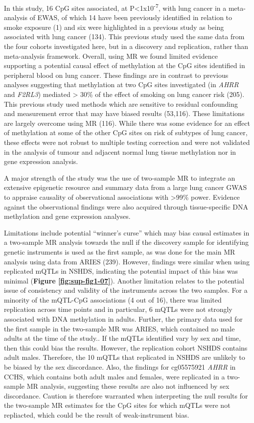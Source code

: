 \documentclass[11pt,oneside]{bristolthesis}
\begin{document}
In this study, 16 CpG sites associated, at P\textless1x10\textsuperscript{-7}, with lung cancer in a meta-analysis of EWAS, of which 14 have been previously identified in relation to smoke exposure (1) and six were highlighted in a previous study as being associated with lung cancer (134). This previous study used the same data from the four cohorts investigated here, but in a discovery and replication, rather than meta-analysis framework. Overall, using MR we found limited evidence supporting a potential causal effect of methylation at the CpG sites identified in peripheral blood on lung cancer. These findings are in contrast to previous analyses suggesting that methylation at two CpG sites investigated (in \emph{AHRR} and \emph{F2RL3}) mediated \textgreater{} 30\% of the effect of smoking on lung cancer risk (205). This previous study used methods which are sensitive to residual confounding and measurement error that may have biased results (53,116). These limitations are largely overcome using MR (116). While there was some evidence for an effect of methylation at some of the other CpG sites on risk of subtypes of lung cancer, these effects were not robust to multiple testing correction and were not validated in the analysis of tumour and adjacent normal lung tissue methylation nor in gene expression analysis.

A major strength of the study was the use of two-sample MR to integrate an extensive epigenetic resource and summary data from a large lung cancer GWAS to appraise causality of observational associations with \textgreater99\% power. Evidence against the observational findings were also acquired through tissue-specific DNA methylation and gene expression analyses.

Limitations include potential ``winner's curse'' which may bias causal estimates in a two-sample MR analysis towards the null if the discovery sample for identifying genetic instruments is used as the first sample, as was done for the main MR analysis using data from ARIES (239). However, findings were similar when using replicated mQTLs in NSHDS, indicating the potential impact of this bias was minimal (\textbf{Figure \ref{fig:sup-fig1-07}}). Another limitation relates to the potential issue of consistency and validity of the instruments across the two samples. For a minority of the mQTL-CpG associations (4 out of 16), there was limited replication across time points and in particular, 6 mQTLs were not strongly associated with DNA methylation in adults. Further, the primary data used for the first sample in the two-sample MR was ARIES, which contained no male adults at the time of the study.. If the mQTLs identified vary by sex and time, then this could bias the results. However, the replication cohort NSHDS contains adult males. Therefore, the 10 mQTLs that replicated in NSHDS are unlikely to be biased by the sex discordance. Also, the findings for cg05575921 \emph{AHRR} in CCHS, which contains both adult males and females, were replicated in a two-sample MR analysis, suggesting these results are also not influenced by sex discordance. Caution is therefore warranted when interpreting the null results for the two-sample MR estimates for the CpG sites for which mQTLs were not repliacted, which could be the result of weak-instrument bias.
\end{document}
